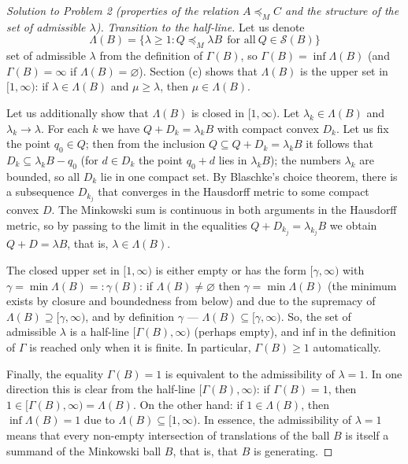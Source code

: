 \documentclass[a4paper,12pt]{report}
\begin{document}
\begin{proof}[Solution to Problem \textup{2} \textup{(}properties of the relation $A\preceq_M C$ and the structure of the set of admissible $\lambda$\textup{)}]
\textit{Transition to the half-line.} Let us denote
\[
\Lambda(B)=\{\lambda\ge1: Q\preceq_M\lambda B\ \ \text{for all}\ Q\in \mathcal S(B)\}
\]
set of admissible $\lambda$ from the definition of $\Gamma(B)$, so $\Gamma(B)=\inf\Lambda(B)$ \textup{(}and $\Gamma(B)=\infty$ if $\Lambda(B)=\varnothing$\textup{)}. Section \textup{(c)} shows that $\Lambda(B)$ is the upper set in $[1,\infty)$\textup{:} if $\lambda\in\Lambda(B)$ and $\mu\ge\lambda$, then $\mu\in\Lambda(B)$.

Let us additionally show that $\Lambda(B)$ is closed in $[1,\infty)$. Let $\lambda_k\in\Lambda(B)$ and $\lambda_k\to\lambda$. For each $k$ we have $Q+D_k=\lambda_k B$ with compact convex $D_k$. Let us fix the point $q_0\in Q$; then from the inclusion $Q\subseteq Q+D_k=\lambda_kB$ it follows that $D_k\subseteq\lambda_kB-q_0$ \textup{(}for $d\in D_k$ the point $q_0+d$ lies in $\lambda_kB$\textup{)}; the numbers $\lambda_k$ are bounded, so all $D_k$ lie in one compact set. By Blaschke's choice theorem, there is a subsequence $D_{k_j}$ that converges in the Hausdorff metric to some compact convex $D$. The Minkowski sum is continuous in both arguments in the Hausdorff metric, so by passing to the limit in the equalities $Q+D_{k_j}=\lambda_{k_j}B$ we obtain $Q+D=\lambda B$, that is, $\lambda\in\Lambda(B)$.

The closed upper set in $[1,\infty)$ is either empty or has the form $[\gamma,\infty)$ with $\gamma=\min\Lambda(B)=:\gamma(B)$\textup{:} if $\Lambda(B)\ne\varnothing$ then $\gamma=\min\Lambda(B)$ \textup{(}the minimum exists by closure and boundedness from below\textup{)} and due to the supremacy of $\Lambda(B)\supseteq[\gamma,\infty)$, and by definition $\gamma$ --- $\Lambda(B)\subseteq[\gamma,\infty)$. So, the set of admissible $\lambda$ is a half-line $[\Gamma(B),\infty)$ \textup{(}perhaps empty\textup{)}, and inf in the definition of $\Gamma$ is reached only when it is finite. In particular, $\Gamma(B)\ge1$ automatically.

Finally, the equality $\Gamma(B)=1$ is equivalent to the admissibility of $\lambda=1$. In one direction this is clear from the half-line $[\Gamma(B),\infty)$\textup{:} if $\Gamma(B)=1$, then $1\in[\Gamma(B),\infty)=\Lambda(B)$. On the other hand\textup{:} if $1\in\Lambda(B)$, then $\inf\Lambda(B)=1$ due to $\Lambda(B)\subseteq[1,\infty)$. In essence, the admissibility of $\lambda=1$ means that every non-empty intersection of translations of the ball $B$ is itself a summand of the Minkowski ball $B$, that is, that $B$ is generating.

\end{proof}
\end{document}
